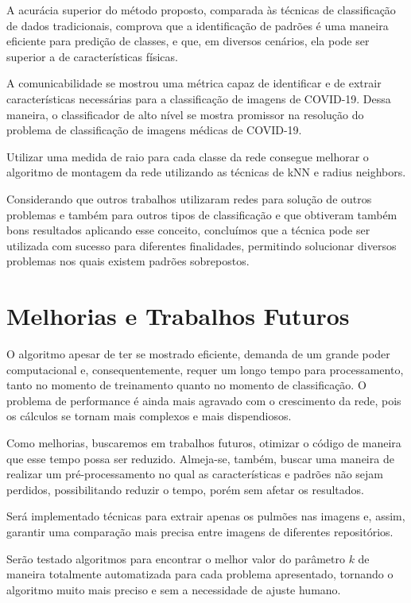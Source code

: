 \documentclass[
12pt,        %
oneside,     %
a4paper,     %
english,       %
brazil        %
%
%
]{ppgca}
\begin{document}
A acurácia superior do método proposto, comparada às técnicas de classificação de dados tradicionais, comprova que a identificação de padrões é uma maneira eficiente para predição de classes, e que, em diversos cenários, ela pode ser superior a de características físicas.

A comunicabilidade se mostrou uma métrica capaz de identificar e de extrair características necessárias para a classificação de imagens de COVID-19. Dessa maneira, o classificador de alto nível se mostra promissor na resolução do problema de classificação de imagens médicas de COVID-19.

Utilizar uma medida de raio para cada classe da rede consegue melhorar o algoritmo de montagem da rede utilizando as técnicas de kNN e radius neighbors.

Considerando que outros trabalhos utilizaram redes para solução de outros problemas e também para outros tipos de classificação e que obtiveram também bons resultados aplicando esse conceito, concluímos que a técnica pode ser utilizada com sucesso para diferentes finalidades, permitindo solucionar diversos problemas nos quais existem padrões sobrepostos\cite{silva2012a, Colliri2018}.


\section{Melhorias e Trabalhos Futuros}

O algoritmo apesar de ter se mostrado eficiente, demanda de um grande poder computacional e, consequentemente, requer um longo tempo para processamento, tanto no momento de treinamento quanto no momento de classificação. O problema de performance é ainda mais agravado com o crescimento da rede, pois os cálculos se tornam mais complexos e mais dispendiosos.

Como melhorias, buscaremos em trabalhos futuros, otimizar o código de maneira que esse tempo possa ser reduzido. Almeja-se, também, buscar uma maneira de realizar um pré-processamento no qual as características e padrões não sejam perdidos, possibilitando reduzir o tempo, porém sem afetar os resultados.

Será implementado técnicas para extrair apenas os pulmões nas imagens e, assim, garantir uma comparação mais precisa entre imagens de diferentes repositórios.

Serão testado algoritmos para encontrar o melhor valor do parâmetro $k$ de maneira totalmente automatizada para cada problema apresentado, tornando o algoritmo muito mais preciso e sem a necessidade de ajuste humano.
\end{document}
